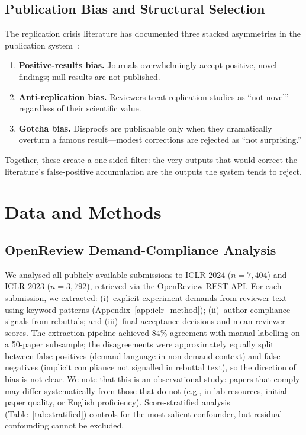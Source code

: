 \documentclass{article}
\begin{document}
\subsection{Publication Bias and Structural Selection}

The replication crisis literature has documented three stacked asymmetries in the publication system~\citep{franco_publication_2014, simonsohn_p_curve_2014}:

\begin{enumerate}[leftmargin=*]
\item \textbf{Positive-results bias.} Journals overwhelmingly accept positive, novel findings; null results are not published.
\item \textbf{Anti-replication bias.} Reviewers treat replication studies as ``not novel'' regardless of their scientific value.
\item \textbf{Gotcha bias.} Disproofs are publishable only when they dramatically overturn a famous result---modest corrections are rejected as ``not surprising.''
\end{enumerate}

Together, these create a one-sided filter: the very outputs that would correct the literature's false-positive accumulation are the outputs the system tends to reject.

\section{Data and Methods}
\label{sec:methods}

\subsection{OpenReview Demand-Compliance Analysis}

We analysed all publicly available submissions to ICLR 2024 ($n = 7{,}404$) and ICLR 2023 ($n = 3{,}792$), retrieved via the OpenReview REST API. For each submission, we extracted: (i)~explicit experiment demands from reviewer text using keyword patterns (Appendix~\ref{app:iclr_method}); (ii)~author compliance signals from rebuttals; and (iii)~final acceptance decisions and mean reviewer scores. The extraction pipeline achieved 84\% agreement with manual labelling on a 50-paper subsample; the disagreements were approximately equally split between false positives (demand language in non-demand context) and false negatives (implicit compliance not signalled in rebuttal text), so the direction of bias is not clear. We note that this is an observational study: papers that comply may differ systematically from those that do not (e.g., in lab resources, initial paper quality, or English proficiency). Score-stratified analysis (Table~\ref{tab:stratified}) controls for the most salient confounder, but residual confounding cannot be excluded.
\end{document}
